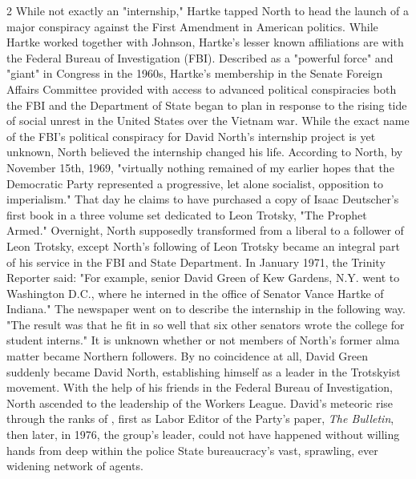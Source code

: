 \documentclass[10pt,a4paper,twoside]{article} %
\begin{document}
\begin{multicols}{2}
{\newline \indent While not exactly an "internship," Hartke tapped North to head the launch of a major conspiracy against the First Amendment in American politics. While Hartke worked together with Johnson, Hartke's lesser known affiliations are with the Federal Bureau of Investigation (FBI). Described as a "powerful force" and "giant" in Congress in the 1960s, Hartke's membership in the Senate Foreign Affairs Committee provided with access to advanced political conspiracies both the FBI and the Department of State began to plan in response to the rising tide of social unrest in the United States over the Vietnam war. While the exact name of the FBI's political conspiracy for David North's internship project is yet unknown, North believed the internship changed his life. 
\newline \indent According to North, by November 15th, 1969, "virtually nothing remained of my earlier hopes that the Democratic Party represented a progressive, let alone socialist, opposition to imperialism." That day he claims to have purchased a copy of Isaac Deutscher's first book in a three volume set dedicated to Leon Trotsky, "The Prophet Armed." Overnight, North supposedly transformed from a liberal to a follower of Leon Trotsky, except North's following of Leon Trotsky became an integral part of his service in the FBI and State Department. 
\newline \indent In January 1971, the Trinity Reporter said: "For example, senior David Green of Kew Gardens, N.Y. went to Washington D.C., where he interned in the office of Senator Vance Hartke of Indiana." The newspaper went on to describe the internship in the following way. "The result was that he fit in so well that six other senators wrote the college for student interns." It is unknown whether or not members of North's former alma matter became Northern followers. By no coincidence at all, David Green suddenly became David North, establishing himself as a leader in the Trotskyist movement. With the help of his friends in the Federal Bureau of Investigation, North ascended to the leadership of the Workers League. David's meteoric rise through the ranks of , first as Labor Editor of the Party's paper, \emph{The Bulletin}, then later, in 1976, the group's leader, could not have happened without willing hands from deep within the police State bureaucracy's vast, sprawling, ever widening network of agents. 
}
\end{multicols}
\end{document}
